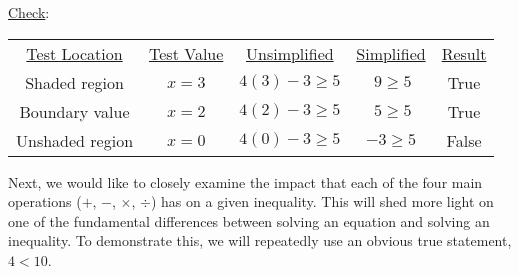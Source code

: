 \underline{Check}:\par

\begin{center}
\begin{tabular}{ccccc}
\underline{Test Location} & \underline{Test Value} & \underline{Unsimplified} & \underline{Simplified} & \underline{Result}\\
Shaded region & $x=3$ & $4(3)-3\geq 5$ & $~9\geq 5$ & True\\
Boundary value & $x=2$ & $4(2)-3\geq 5$ & $~5\geq 5$ & True\\
Unshaded region & $x=0$ & $4(0)-3\geq 5$ & $-3\geq 5$ &False
\end{tabular}
\end{center}

Next, we would like to closely examine the impact that each of the four main operations ($+$, $-$, $\times$, $\div$) has on a given inequality.  This will shed more light on one of the fundamental differences between solving an equation and solving an inequality.  To demonstrate this, we will repeatedly use an obvious true statement, $4<10$.\par

